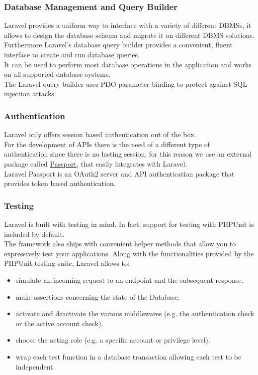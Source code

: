 \subsubsection*{Database Management and Query Builder}
\label{dbmanagement}
Laravel provides a uniform way to interface with a variety of different DBMSs, it allows to design the database schema and migrate it on different DBMS solutions.\\
Furthermore Laravel's database query builder provides a convenient, fluent interface to create and run database queries.\\
It can be used to perform most database operations in the application and works on all supported database systems.\\
The Laravel query builder uses PDO parameter binding to protect against SQL injection attacks. 

\subsubsection*{Authentication}
Laravel only offers session based authentication out of the box.\\
For the development of APIs there is the need of a different type of authentication since there is no lasting session, for this reason we use an external package called \href{https://laravel.com/docs/5.5/passport}{Passport}, that easily integrates with Laravel.\\
Laravel Passport is an OAuth2 server and API authentication package that provides token based authentication.

\subsubsection*{Testing}
Laravel is built with testing in mind. In fact, support for testing with PHPUnit is included by default.\\
The framework also ships with convenient helper methods that allow you to expressively test your applications.
Along with the functionalities provided by the PHPUnit testing suite, Laravel allows to:
\begin{itemize}
	\item simulate an incoming request to an endpoint and the subsequent response.
	\item make assertions concerning the state of the Database.
	\item activate and deactivate the various middlewares (e.g. the authentication check or the active account check).
	\item choose the acting role (e.g. a specific account or privilege level).
	\item wrap each test function in a database transaction allowing each test to be independent.
\end{itemize}  

